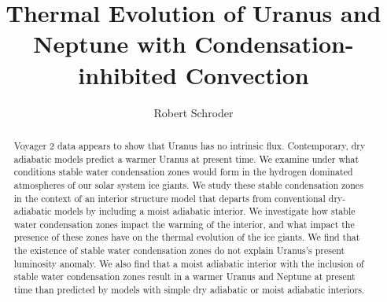 \documentclass[11pt]{ucscthesisbs}
\begin{document}

\title{Thermal Evolution of Uranus and Neptune with Condensation-inhibited Convection}
\author{Robert Schroder}
%

%





\maketitle
\copyrightpage

\begin{frontmatter}

\begin{abstract}
Voyager 2 data appears to show that Uranus has no intrinsic flux. Contemporary, dry adiabatic models predict a warmer Uranus at present time. We examine under what conditions stable water condensation zones would form in the hydrogen dominated atmospheres of our solar system ice giants. We study these stable condensation zones in the context of an interior structure model that departs from conventional dry-adiabatic models by including a moist adiabatic interior. We investigate how stable water condensation zones impact the warming of the interior, and what impact the presence of these zones have on the thermal evolution of the ice giants. We find that the existence of stable water condensation zones do not explain Uranus's present luminosity anomaly. We also find that a moist adiabatic interior with the inclusion of stable water condensation zones result in a warmer Uranus and Neptune at present time than predicted by models with simple dry adiabatic or moist adiabatic interiors.
\end{abstract}

\tableofcontents
%
%
\listoffigures


\end{frontmatter}
\end{document}
